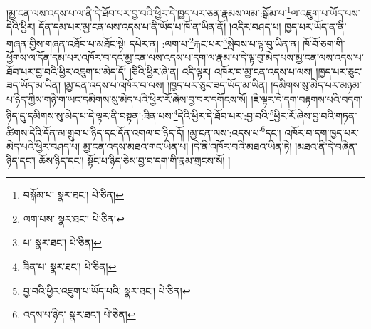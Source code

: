 །མྱ་ངན་ལས་འདས་པ་ལ་ནི་དེ་ཐོབ་པར་བྱ་བའི་ཕྱིར་དེ་ཁྱད་པར་ཅན་རྣམས་ལམ་:སྒོམ་པ་\footnote{བསྒོམ་པ་  སྣར་ཐང་།  པེ་ཅིན། }ལ་འཇུག་པ་ཡོད་པས་དེའི་ཕྱིར། དོན་དམ་པར་མྱ་ངན་ལས་འདས་པ་ནི་ཡོད་པ་ཁོ་ན་ཡིན་ནོ། །འདིར་བཤད་པ། ཁྱད་པར་ཡོད་ན་ནི་གཞན་གྱིས་གཞན་འཐོབ་པ་མཐོང་སྟེ། དཔེར་ན། :ལག་པ་\footnote{ལག་པས་  སྣར་ཐང་།  པེ་ཅིན། }རྐང་པར་\footnote{པ་  སྣར་ཐང་།  པེ་ཅིན། }སླེབས་པ་ལྟ་བུ་ཡིན་ན། ཁོ་བོ་ཅག་གི་ཕྱོགས་ལ་དོན་དམ་པར་འཁོར་བ་དང་མྱ་ངན་ལས་འདས་པ་དག་ལ་རྣམ་པ་དེ་ལྟ་བུ་མེད་པས་མྱ་ངན་ལས་འདས་པ་ཐོབ་པར་བྱ་བའི་ཕྱིར་འཇུག་པ་མེད་དོ། །ཅིའི་ཕྱིར་ཞེ་ན། འདི་ལྟར། འཁོར་བ་མྱ་ངན་འདས་པ་ལས། །ཁྱད་པར་ཅུང་ཟད་ཡོད་མ་ཡིན། །མྱ་ངན་འདས་པ་འཁོར་བ་ལས། །ཁྱད་པར་ཅུང་ཟད་ཡོད་མ་ཡིན། །དམིགས་སུ་མེད་པར་མཉམ་པ་ཉིད་ཀྱིས་གཉི་ག་ཡང་དམིགས་སུ་མེད་པའི་ཕྱིར་རོ་ཞེས་བྱ་བར་དགོངས་སོ། །ཇི་ལྟར་དེ་དག་བརྟགས་པའི་བདག་ཉིད་དུ་དམིགས་སུ་མེད་པ་དེ་ལྟར་ནི་བསྟན་:ཟིན་པས་\footnote{ཟིན་པ་  སྣར་ཐང་།  པེ་ཅིན། }དེའི་ཕྱིར་དེ་ཐོབ་པར་:བྱ་བའི་\footnote{བྱ་བའི་ཕྱིར་འཇུག་པ་ཡོད་པའི་  སྣར་ཐང་།  པེ་ཅིན། }ཕྱིར་རོ་ཞེས་བྱ་བའི་གཏན་ཚིགས་དེའི་དོན་མ་གྲུབ་པ་ཉིད་དང་དོན་འགལ་བ་ཉིད་དོ། །མྱ་ངན་ལས་:འདས་པ་\footnote{འདས་པ་ཉིད་  སྣར་ཐང་།  པེ་ཅིན། }དང་། འཁོར་བ་དག་ཁྱད་པར་མེད་པའི་ཕྱིར་བཤད་པ། མྱ་ངན་འདས་མཐའ་གང་ཡིན་པ། །དེ་ནི་འཁོར་བའི་མཐའ་ཡིན་ཏེ། །མཐའ་ནི་དེ་བཞིན་ཉིད་དང་། ཆོས་ཉིད་དང་། སྟོང་པ་ཉིད་ཅེས་བྱ་བ་དག་གི་རྣམ་གྲངས་སོ། །
